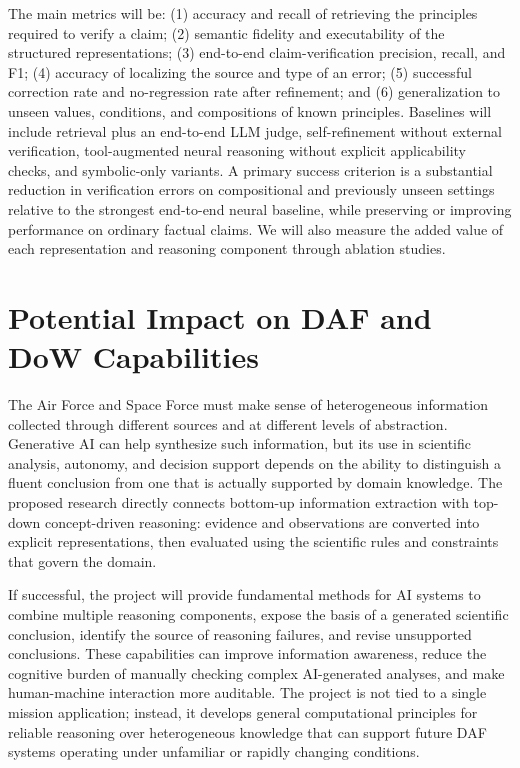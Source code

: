 \documentclass[12pt]{article}
\begin{document}
The main metrics will be: (1) accuracy and recall of retrieving the principles required to verify a claim; (2) semantic fidelity and executability of the structured representations; (3) end-to-end claim-verification precision, recall, and F1; (4) accuracy of localizing the source and type of an error; (5) successful correction rate and no-regression rate after refinement; and (6) generalization to unseen values, conditions, and compositions of known principles. Baselines will include retrieval plus an end-to-end LLM judge, self-refinement without external verification, tool-augmented neural reasoning without explicit applicability checks, and symbolic-only variants. A primary success criterion is a substantial reduction in verification errors on compositional and previously unseen settings relative to the strongest end-to-end neural baseline, while preserving or improving performance on ordinary factual claims. We will also measure the added value of each representation and reasoning component through ablation studies.

\section*{Potential Impact on DAF and DoW Capabilities}

The Air Force and Space Force must make sense of heterogeneous information collected through different sources and at different levels of abstraction. Generative AI can help synthesize such information, but its use in scientific analysis, autonomy, and decision support depends on the ability to distinguish a fluent conclusion from one that is actually supported by domain knowledge. The proposed research directly connects bottom-up information extraction with top-down concept-driven reasoning: evidence and observations are converted into explicit representations, then evaluated using the scientific rules and constraints that govern the domain.

If successful, the project will provide fundamental methods for AI systems to combine multiple reasoning components, expose the basis of a generated scientific conclusion, identify the source of reasoning failures, and revise unsupported conclusions. These capabilities can improve information awareness, reduce the cognitive burden of manually checking complex AI-generated analyses, and make human-machine interaction more auditable. The project is not tied to a single mission application; instead, it develops general computational principles for reliable reasoning over heterogeneous knowledge that can support future DAF systems operating under unfamiliar or rapidly changing conditions.
\end{document}
